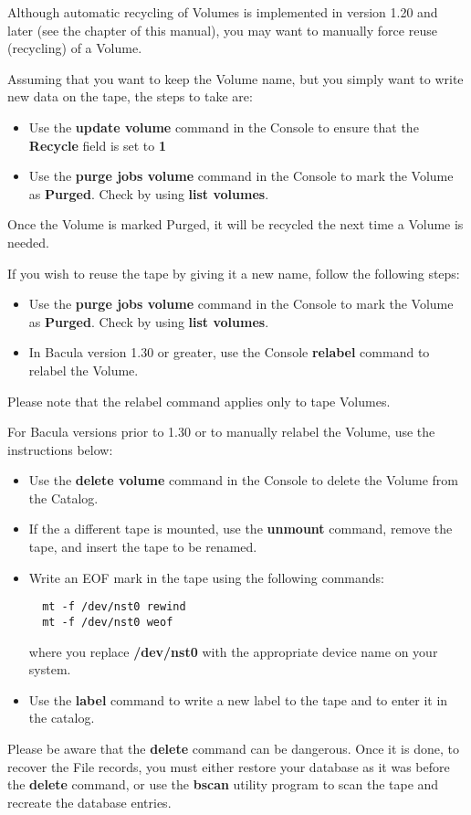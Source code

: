 Although automatic recycling of Volumes is implemented in version 1.20 and
later (see the 
 chapter of
this manual), you may want to manually force reuse (recycling) of a Volume. 

Assuming that you want to keep the Volume name, but you simply want to write
new data on the tape, the steps to take are: 

\begin{itemize}
\item Use the {\bf update volume} command in the Console to  ensure that the
   {\bf Recycle} field is set to {\bf 1}  
\item Use the {\bf purge jobs volume} command in the Console  to mark the
   Volume as {\bf Purged}. Check by using  {\bf list volumes}. 
   \end{itemize}

Once the Volume is marked Purged, it will be recycled the next time a Volume
is needed. 

If you wish to reuse the tape by giving it a new name, follow the following
steps: 

\begin{itemize}
\item Use the {\bf purge jobs volume} command in the Console  to mark the
   Volume as {\bf Purged}. Check by using  {\bf list volumes}.  
\item In Bacula version 1.30 or greater, use the Console  {\bf relabel}
   command to relabel the Volume. 
   \end{itemize}

Please note that the relabel command applies only to tape Volumes. 

For Bacula versions prior to 1.30 or to manually relabel the Volume, use the
instructions below: 

\begin{itemize}
\item Use the {\bf delete volume} command in the Console  to delete the Volume
   from the Catalog.  
\item If the a different tape is mounted, use the {\bf unmount}  command,
   remove the tape, and insert the tape to be  renamed.  
\item Write an EOF mark in the tape using the following  commands: 

   \footnotesize
\begin{verbatim}
  mt -f /dev/nst0 rewind
  mt -f /dev/nst0 weof
\end{verbatim}
\normalsize

where you replace {\bf /dev/nst0} with the appropriate  device name on your
system.  
\item Use the {\bf label} command to write a new label to  the tape and to
   enter it in the catalog. 
   \end{itemize}

Please be aware that the {\bf delete} command can be dangerous. Once it is
done, to recover the File records, you must either restore your database as it
was before the {\bf delete} command, or use the {\bf bscan} utility program to
scan the tape and recreate the database entries. 
